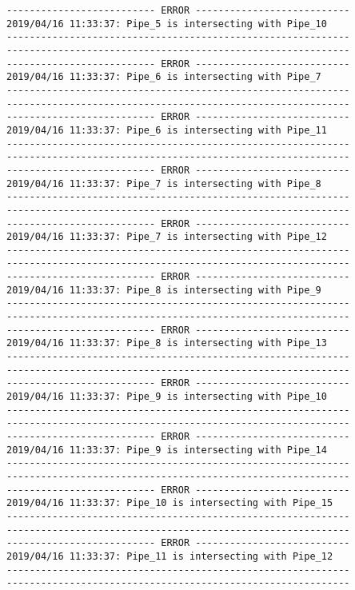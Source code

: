 \documentclass{article}
\begin{document}
{\begin{verbatim}
-------------------------- ERROR ---------------------------
2019/04/16 11:33:37: Pipe_5 is intersecting with Pipe_10
------------------------------------------------------------
------------------------------------------------------------
-------------------------- ERROR ---------------------------
2019/04/16 11:33:37: Pipe_6 is intersecting with Pipe_7
------------------------------------------------------------
------------------------------------------------------------
-------------------------- ERROR ---------------------------
2019/04/16 11:33:37: Pipe_6 is intersecting with Pipe_11
------------------------------------------------------------
------------------------------------------------------------
-------------------------- ERROR ---------------------------
2019/04/16 11:33:37: Pipe_7 is intersecting with Pipe_8
------------------------------------------------------------
------------------------------------------------------------
-------------------------- ERROR ---------------------------
2019/04/16 11:33:37: Pipe_7 is intersecting with Pipe_12
------------------------------------------------------------
------------------------------------------------------------
-------------------------- ERROR ---------------------------
2019/04/16 11:33:37: Pipe_8 is intersecting with Pipe_9
------------------------------------------------------------
------------------------------------------------------------
-------------------------- ERROR ---------------------------
2019/04/16 11:33:37: Pipe_8 is intersecting with Pipe_13
------------------------------------------------------------
------------------------------------------------------------
-------------------------- ERROR ---------------------------
2019/04/16 11:33:37: Pipe_9 is intersecting with Pipe_10
------------------------------------------------------------
------------------------------------------------------------
-------------------------- ERROR ---------------------------
2019/04/16 11:33:37: Pipe_9 is intersecting with Pipe_14
------------------------------------------------------------
------------------------------------------------------------
-------------------------- ERROR ---------------------------
2019/04/16 11:33:37: Pipe_10 is intersecting with Pipe_15
------------------------------------------------------------
------------------------------------------------------------
-------------------------- ERROR ---------------------------
2019/04/16 11:33:37: Pipe_11 is intersecting with Pipe_12
------------------------------------------------------------
------------------------------------------------------------

\end{verbatim}}
\end{document}
